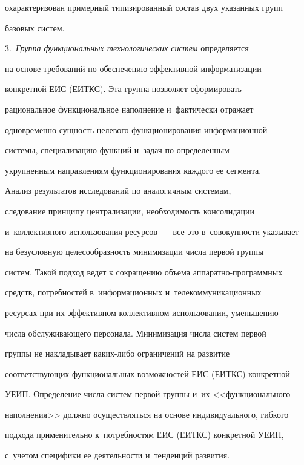 охарактеризован примерный типизированный состав двух указанных групп 

базовых систем.

     

     \smallskip

     

3.\ \textit{Группа функциональных технологических систем} определяется 

на основе требований по обеспечению эффективной информатизации 

конкретной ЕИС (ЕИТКС). Эта группа позволяет сформировать 

рациональное функциональное наполнение и~фактически отражает 

одновременно сущность целевого функционирования информационной 

системы, специализацию функций и~задач по определенным 

укрупненным направлениям функционирования каждого ее сегмента.



     Анализ результатов исследований по аналогичным системам, 

следование принципу централизации, необходимость консолидации 

и~коллективного использования ресурсов~--- все это в~совокупности указывает 

на безусловную целесообразность минимизации числа первой группы 

систем. Такой подход ведет к сокращению объема ап\-па\-рат\-но-про\-грам\-мных 

средств, потребностей в~информационных и~телекоммуникационных 

ресурсах при их эффективном коллективном использовании, уменьшению 

числа обслуживающего персонала. Минимизация числа систем первой 

группы не накладывает каких-либо ограничений на развитие 

соответствующих функциональных возможностей ЕИС (ЕИТКС) конкретной 

УЕИП. Определение числа систем первой группы и~их <<функционального 

наполнения>> должно осуществляться на основе индивидуального, гибкого 

подхода применительно к~потребностям ЕИС (ЕИТКС) конкретной УЕИП, 

с~учетом специфики ее деятельности и~тенденций развития.

     



